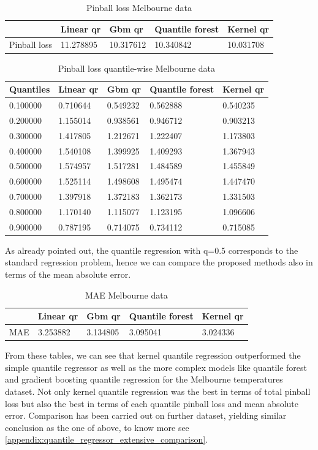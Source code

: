 \begin{table}
\caption{Pinball loss Melbourne data}
\begin{tabular}{lllll}
    \toprule
     & Linear qr & Gbm qr & Quantile forest & Kernel qr \\
    \midrule
    Pinball loss & 11.278895 & 10.317612 & 10.340842 & 10.031708 \\
    \bottomrule
    \end{tabular}
\end{table}

\begin{table}
    \caption{Pinball loss quantile-wise Melbourne data}
    \begin{tabular}{lllll}
    \toprule
    Quantiles & Linear qr & Gbm qr & Quantile forest & Kernel qr \\
    \midrule
    0.100000 & 0.710644 & 0.549232 & 0.562888 & 0.540235 \\
    0.200000 & 1.155014 & 0.938561 & 0.946712 & 0.903213 \\
    0.300000 & 1.417805 & 1.212671 & 1.222407 & 1.173803 \\
    0.400000 & 1.540108 & 1.399925 & 1.409293 & 1.367943 \\
    0.500000 & 1.574957 & 1.517281 & 1.484589 & 1.455849 \\
    0.600000 & 1.525114 & 1.498608 & 1.495474 & 1.447470 \\
    0.700000 & 1.397918 & 1.372183 & 1.362173 & 1.331503 \\
    0.800000 & 1.170140 & 1.115077 & 1.123195 & 1.096606 \\
    0.900000 & 0.787195 & 0.714075 & 0.734112 & 0.715085 \\
    \bottomrule
    \end{tabular}
\end{table}

As already pointed out, the quantile regression with q=0.5 corresponds to the standard regression problem, hence we can compare the proposed methods also in terms of the mean absolute error.

\begin{table}
\caption{MAE Melbourne data}
\begin{tabular}{lllll}
    \toprule
     & Linear qr & Gbm qr & Quantile forest & Kernel qr \\
    \midrule
    MAE & 3.253882 & 3.134805 & 3.095041 & 3.024336 \\
    \bottomrule
    \end{tabular}
\end{table}  
From these tables, we can see that kernel quantile regression outperformed the simple quantile regressor as well as the more complex models like quantile forest and gradient boosting quantile regression for the Melbourne temperatures dataset. Not only kernel quantile regression was the best in terms of total pinball loss but also the best in terms of each quantile pinball loss and mean absolute error.
Comparison has been carried out on further dataset, yielding similar conclusion as the one of above, to know more see \ref{appendix:quantile_regressor_extensive_comparison}.


